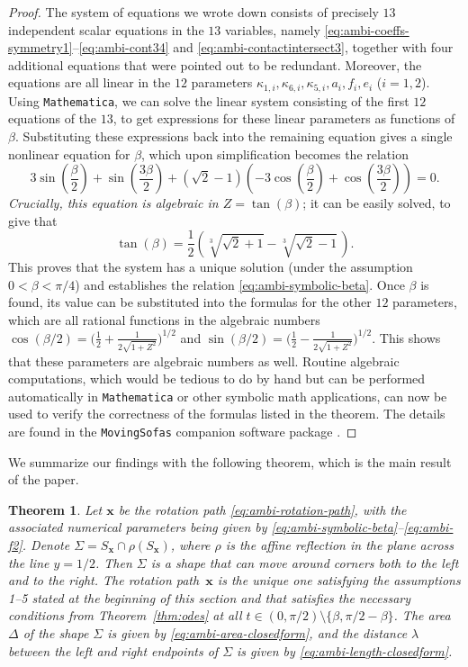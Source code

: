 \documentclass[11pt]{article}
\newtheorem{thm}{Theorem}
\begin{document}
\begin{proof}
The system of equations we wrote down consists of precisely $13$ independent scalar equations in the $13$ variables, namely \eqref{eq:ambi-coeffs-symmetry1}--\eqref{eq:ambi-cont34} and \eqref{eq:ambi-contactintersect3}, together with four additional equations that were pointed out to be redundant. Moreover, the equations are all linear in the $12$ parameters $\kappa_{1,i}, \kappa_{6,i}, \kappa_{5,i}, a_i, f_i, e_i$ ($i=1,2$). Using \texttt{Mathematica}, we can solve the linear system consisting of the first $12$ equations of the $13$, to get expressions for these linear parameters as functions of $\beta$. Substituting these expressions back into the remaining equation gives a single nonlinear equation for $\beta$, which upon simplification becomes the relation
$$
3 \sin \left(\frac{\beta }{2}\right)+\sin \left(\frac{3 \beta }{2}\right)+ \left(\sqrt{2}-1\right) \left( -3\cos \left(\frac{\beta }{2}\right)+\cos \left(\frac{3 \beta }{2}\right) \right)=0.
$$
\textit{Crucially, this equation is algebraic in
$Z=\tan(\beta)$};
it can be easily solved, to give that
$$ 
\tan(\beta)=
\frac{1}{2} \left( \sqrt[3]{\sqrt{2}+1}- \sqrt[3]{\sqrt{2}-1}\, \right).
$$
This proves that the system has a unique solution (under the assumption $0<\beta<\pi/4$) and establishes the relation \eqref{eq:ambi-symbolic-beta}. Once $\beta$ is found, its value can be substituted into the formulas for the other $12$ parameters, which are all rational functions in the algebraic numbers $\cos(\beta/2)=\big(\frac12+\frac{1}{2\sqrt{1+Z^2}}\big)^{1/2}$ and $\sin(\beta/2)=\big(\frac12-\frac{1}{2\sqrt{1+Z^2}}\big)^{1/2}$. This shows that these parameters are algebraic numbers as well. Routine algebraic computations, which would be tedious to do by hand but can be performed automatically in \texttt{Mathematica} or other symbolic math applications, can now be used to verify the correctness of the formulas listed in the theorem. The details are found in the \texttt{MovingSofas} companion software package \cite[Section~10]{romik-sofa-mathematica}.
\end{proof}

We summarize our findings with the following theorem, which is the main result of the paper.

\begin{thm} Let $\mathbf{x}$ be the rotation path \eqref{eq:ambi-rotation-path}, with the associated numerical parameters being given by \eqref{eq:ambi-symbolic-beta}--\eqref{eq:ambi-f2}. Denote $\Sigma=S_\mathbf{x}\cap \rho(S_\mathbf{x})$, where $\rho$ is the affine reflection in the plane across the line $y=1/2$. Then $\Sigma$ is a shape that can move around corners both to the left and to the right. The rotation path~$\mathbf{x}$ is the unique one 
satisfying the assumptions 1--5 stated at the beginning of this section and that satisfies the necessary conditions from Theorem~\ref{thm:odes} at all $t\in (0,\pi/2)\setminus\{\beta,\pi/2-\beta\}$. The area $\Delta$ of the shape $\Sigma$ is given by \eqref{eq:ambi-area-closedform}, and the distance $\lambda$ between the left and right endpoints of $\Sigma$ is given by
\eqref{eq:ambi-length-closedform}.
\end{thm}
\end{document}
